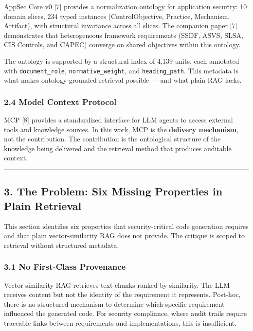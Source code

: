 \documentclass[
]{article}
\begin{document}
AppSec Core v0 {[}7{]} provides a normalization ontology for application
security: 10 domain slices, 234 typed instances (ControlObjective,
Practice, Mechanism, Artifact), with structural invariance across all
slices. The companion paper {[}7{]} demonstrates that heterogeneous
framework requirements (SSDF, ASVS, SLSA, CIS Controls, and CAPEC)
converge on shared objectives within this ontology.

The ontology is supported by a structural index of 4,139 units, each
annotated with \texttt{document\_role}, \texttt{normative\_weight}, and
\texttt{heading\_path}. This metadata is what makes ontology-grounded
retrieval possible --- and what plain RAG lacks.

\subsubsection{2.4 Model Context Protocol}\label{model-context-protocol}

MCP {[}8{]} provides a standardized interface for LLM agents to access
external tools and knowledge sources. In this work, MCP is the
\textbf{delivery mechanism}, not the contribution. The contribution is
the ontological structure of the knowledge being delivered and the
retrieval method that produces auditable context.

\begin{center}\rule{0.5\linewidth}{0.5pt}\end{center}

\subsection{3. The Problem: Six Missing Properties in Plain
Retrieval}\label{the-problem-six-missing-properties-in-plain-retrieval}

This section identifies six properties that security-critical code
generation requires and that plain vector-similarity RAG does not
provide. The critique is scoped to retrieval without structured
metadata.

\subsubsection{3.1 No First-Class
Provenance}\label{no-first-class-provenance}

Vector-similarity RAG retrieves text chunks ranked by similarity. The
LLM receives content but not the identity of the requirement it
represents. Post-hoc, there is no structured mechanism to determine
which specific requirement influenced the generated code. For security
compliance, where audit trails require traceable links between
requirements and implementations, this is insufficient.
\end{document}
